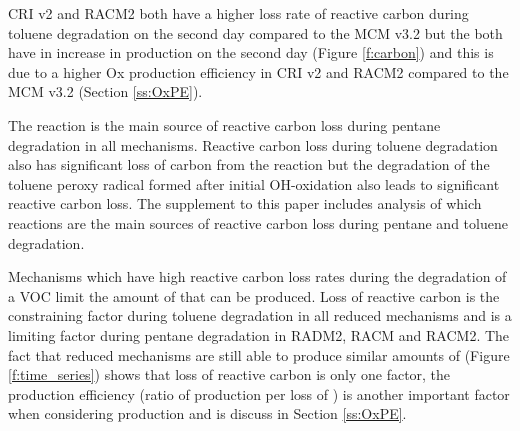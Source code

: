 CRI v2 and RACM2 both have a higher loss rate of reactive carbon during toluene degradation on the second day compared to the MCM v3.2 but the both have in increase in  production on the second day (Figure \ref{f:carbon}) and this is due to a higher Ox production efficiency in CRI v2 and RACM2 compared to the MCM v3.2 (Section \ref{ss:OxPE}).

The  reaction is the main source of reactive carbon loss during pentane degradation in all mechanisms.
Reactive carbon loss during toluene degradation also has significant loss of carbon from the  reaction but the degradation of the toluene peroxy radical formed after initial OH-oxidation also leads to significant reactive carbon loss.
The supplement to this paper includes analysis of which reactions are the main sources of reactive carbon loss during pentane and toluene degradation.

Mechanisms which have high reactive carbon loss rates during the degradation of a VOC limit the amount of  that can be produced.
Loss of reactive carbon is the constraining factor during toluene degradation in all reduced mechanisms and is a limiting factor during pentane degradation in RADM2, RACM and RACM2.
The fact that reduced mechanisms are still able to produce similar amounts of  (Figure \ref{f:time_series}) shows that loss of reactive carbon is only one factor, the  production efficiency (ratio of  production per loss of ) is another important factor when considering  production and is discuss in Section \ref{ss:OxPE}.

